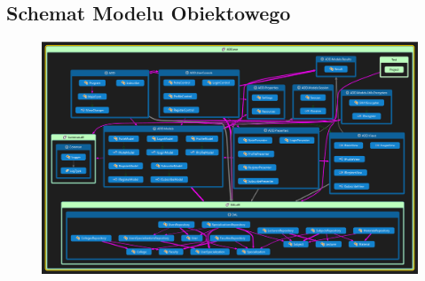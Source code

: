 \documentclass[12pt,a4paper]{article}
\begin{document}
\clearpage \subsection{Schemat Modelu Obiektowego}
			\begin{figure}[H]
			\centering
			\includegraphics[width=1.0\textwidth]{class_diagram}
			\end{figure}
\end{document}
